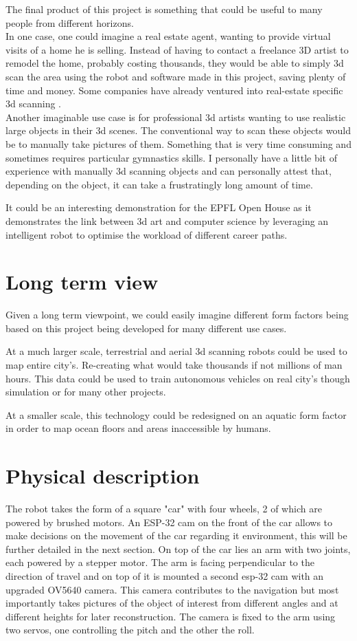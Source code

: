 \documentclass{article}
\begin{document}
The final product of this project is something that could be useful to many people from different horizons. \\
In one case, one could imagine a real estate agent, wanting to provide virtual visits of a home he is selling. Instead of having to contact a freelance 3D artist to remodel the home, probably costing thousands, they would be able to simply 3d scan the area using the robot and software made in this project, saving plenty of time and money. Some companies have already ventured into real-estate specific 3d scanning \cite{matterport}. \\
Another imaginable use case is for professional 3d artists wanting to use realistic large objects in their 3d scenes. The conventional way to scan these objects would be to manually take pictures of them. Something that is very time consuming and sometimes requires particular gymnastics skills.
I personally have a little bit of experience with manually 3d scanning objects and can personally attest that, depending on the object, it can take a frustratingly long amount of time.

It could be an interesting demonstration for the EPFL Open House as it demonstrates the link between 3d art and computer science by leveraging an intelligent robot to optimise the workload of different career paths.

\section{Long term view}

Given a long term viewpoint, we could easily imagine different form factors being based on this project being developed for many different use cases. 

At a much larger scale, terrestrial and aerial 3d scanning robots could be used to map entire city's. Re-creating what would take thousands if not millions of man hours. This data could be used to train autonomous vehicles on real city's though simulation or for many other projects.

At a smaller scale, this technology could be redesigned on an aquatic form factor in order to map ocean floors and areas inaccessible by humans.

\newpage
\section{Physical description}

The robot takes the form of a square "car" with four wheels, 2 of which are powered by brushed motors. An ESP-32 cam on the front of the car allows to make decisions on the movement of the car regarding it environment, this will be further detailed in the next section. On top of the car lies an arm with two joints, each powered by a stepper motor. The arm is facing perpendicular to the direction of travel and on top of it is mounted a second esp-32 cam with an upgraded OV5640 camera. This camera contributes to the navigation but most importantly takes pictures of the object of interest from different angles and at different heights for later reconstruction. The camera is fixed to the arm using two servos, one controlling the pitch and the other the roll.
\end{document}
